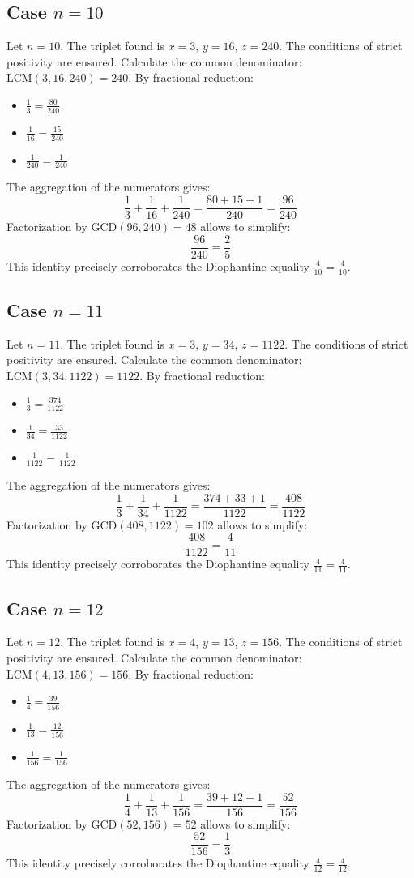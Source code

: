 \documentclass[11pt,a4paper]{article}
\begin{document}
\subsection{Case $n = 10$}
Let $n = 10$. The triplet found is $x = 3$, $y = 16$, $z = 240$.
The conditions of strict positivity are ensured.
Calculate the common denominator: $\text{LCM}(3, 16, 240) = 240$.
By fractional reduction:
\begin{itemize}
    \item $\frac{1}{3} = \frac{80}{240}$
    \item $\frac{1}{16} = \frac{15}{240}$
    \item $\frac{1}{240} = \frac{1}{240}$
\end{itemize}
The aggregation of the numerators gives:
$$ \frac{1}{3} + \frac{1}{16} + \frac{1}{240} = \frac{80 + 15 + 1}{240} = \frac{96}{240} $$
Factorization by $\text{GCD}(96, 240) = 48$ allows to simplify:
$$ \frac{96}{240} = \frac{2}{5} $$
This identity precisely corroborates the Diophantine equality $\frac{4}{10} = \frac{4}{10}$.

\subsection{Case $n = 11$}
Let $n = 11$. The triplet found is $x = 3$, $y = 34$, $z = 1122$.
The conditions of strict positivity are ensured.
Calculate the common denominator: $\text{LCM}(3, 34, 1122) = 1122$.
By fractional reduction:
\begin{itemize}
    \item $\frac{1}{3} = \frac{374}{1122}$
    \item $\frac{1}{34} = \frac{33}{1122}$
    \item $\frac{1}{1122} = \frac{1}{1122}$
\end{itemize}
The aggregation of the numerators gives:
$$ \frac{1}{3} + \frac{1}{34} + \frac{1}{1122} = \frac{374 + 33 + 1}{1122} = \frac{408}{1122} $$
Factorization by $\text{GCD}(408, 1122) = 102$ allows to simplify:
$$ \frac{408}{1122} = \frac{4}{11} $$
This identity precisely corroborates the Diophantine equality $\frac{4}{11} = \frac{4}{11}$.

\subsection{Case $n = 12$}
Let $n = 12$. The triplet found is $x = 4$, $y = 13$, $z = 156$.
The conditions of strict positivity are ensured.
Calculate the common denominator: $\text{LCM}(4, 13, 156) = 156$.
By fractional reduction:
\begin{itemize}
    \item $\frac{1}{4} = \frac{39}{156}$
    \item $\frac{1}{13} = \frac{12}{156}$
    \item $\frac{1}{156} = \frac{1}{156}$
\end{itemize}
The aggregation of the numerators gives:
$$ \frac{1}{4} + \frac{1}{13} + \frac{1}{156} = \frac{39 + 12 + 1}{156} = \frac{52}{156} $$
Factorization by $\text{GCD}(52, 156) = 52$ allows to simplify:
$$ \frac{52}{156} = \frac{1}{3} $$
This identity precisely corroborates the Diophantine equality $\frac{4}{12} = \frac{4}{12}$.
\end{document}
